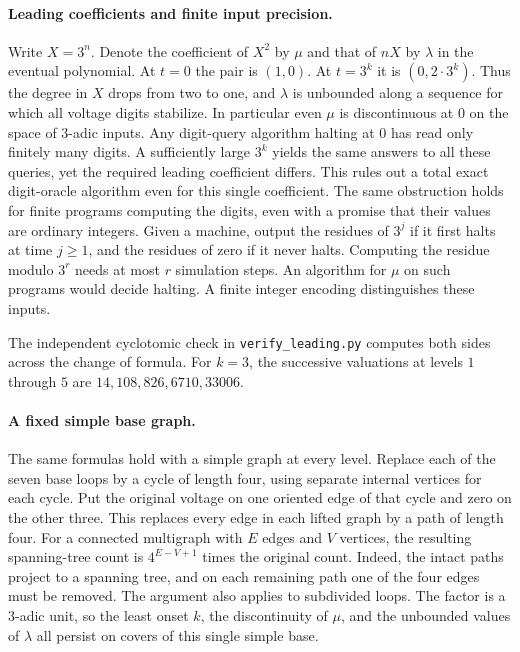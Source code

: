 \paragraph{Leading coefficients and finite input precision.}
Write $X=3^n$. Denote the coefficient of $X^2$ by $\mu$ and that of
$nX$ by $\lambda$ in the eventual polynomial. At $t=0$ the pair is
$(1,0)$. At $t=3^k$ it is $(0,2\cdot3^k)$. Thus the degree in $X$
drops from two to one, and $\lambda$ is unbounded along a sequence for
which all voltage digits stabilize. In particular even $\mu$ is
discontinuous at $0$ on the space of $3$-adic inputs. Any digit-query
algorithm halting at $0$ has read only finitely many digits. A
sufficiently large $3^k$ yields the same answers to all these queries,
yet the required leading coefficient differs. This rules out a total
exact digit-oracle algorithm even for this single coefficient. The same obstruction holds for
finite programs computing the digits, even with a promise that their
values are ordinary integers. Given a machine, output the residues of
$3^j$ if it first halts at time $j\ge1$, and the residues of zero if it
never halts. Computing the residue modulo $3^r$ needs at most $r$
simulation steps. An algorithm for $\mu$ on such programs would decide
halting. A finite integer encoding distinguishes these inputs.

The independent cyclotomic check in \texttt{verify\_leading.py} computes
both sides across the change of formula. For $k=3$, the successive
valuations at levels $1$ through $5$ are $14,108,826,6710,33006$.

\paragraph{A fixed simple base graph.}
The same formulas hold with a simple graph at every level. Replace each
of the seven base loops by a cycle of length four, using separate internal
vertices for each cycle. Put the original voltage on one oriented edge
of that cycle and zero on the other three. This replaces every edge in
each lifted graph by a path of length four. For a connected multigraph
with $E$ edges and $V$ vertices, the resulting spanning-tree count is
$4^{E-V+1}$ times the original count. Indeed, the intact paths project
to a spanning tree, and on each remaining path one of the four edges
must be removed. The argument also applies to subdivided loops.
The factor is a $3$-adic unit, so the least onset $k$, the discontinuity
of $\mu$, and the unbounded values of $\lambda$ all persist on covers
of this single simple base.
